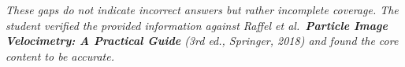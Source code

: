 \documentclass[12pt,a4paper]{article}
\begin{document}
\vspace{0.5em}
\begin{tcolorbox}[
    enhanced,
    colback=lightblue!15!white,
    colframe=accentblue!50!white,
    boxrule=0.5pt,
    arc=3pt,
    left=10pt, right=10pt, top=8pt, bottom=8pt
]
\;\textit{These gaps do not indicate incorrect answers but rather incomplete coverage. The student verified the provided information against Raffel et al.\ \textbf{Particle Image Velocimetry: A Practical Guide} (3rd ed., Springer, 2018) and found the core content to be accurate.}
\end{tcolorbox}
\end{document}
